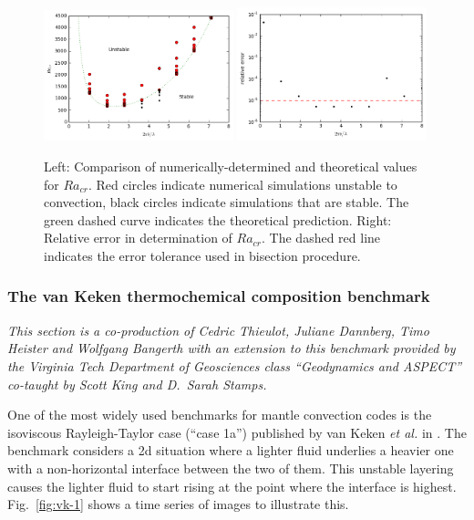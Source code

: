 \documentclass{article}
\begin{document}
\begin{figure}
 \includegraphics[width=0.49\textwidth]{cookbooks/benchmarks/onset-of-convection/racr.png}
 \hfill
 \includegraphics[width=0.49\textwidth]{cookbooks/benchmarks/onset-of-convection/racr_error.png}
 \caption{Left: Comparison of numerically-determined and theoretical values for $Ra_{cr}$. Red circles indicate numerical simulations unstable to convection, black circles indicate simulations that are stable. The green dashed curve indicates the theoretical prediction. Right: Relative error in determination of $Ra_{cr}$. The dashed red line indicates the error tolerance used in bisection procedure.}
 \label{fig:onset-1}
\end{figure}

\subsubsection{The van Keken thermochemical composition benchmark}
\label{sec:benchmark-van-keken}

\textit{This section is a co-production of Cedric Thieulot, Juliane Dannberg,
Timo Heister and Wolfgang Bangerth with an extension to this benchmark provided by the Virginia Tech Department of Geosciences class ``Geodynamics and ASPECT'' co-taught by Scott King and D.~Sarah Stamps.}

One of the most widely used benchmarks for mantle convection codes is the
isoviscous Rayleigh-Taylor case (``case 1a'') published by van Keken \textit{et
al.} in \cite{KKSCND97}.
The benchmark considers a 2d situation where a lighter fluid underlies a heavier
one with a non-horizontal interface between the two of them. This unstable
layering causes the lighter fluid to start rising at the point where the
interface is highest. Fig.~\ref{fig:vk-1} shows a time series of images to
illustrate this.
\end{document}
